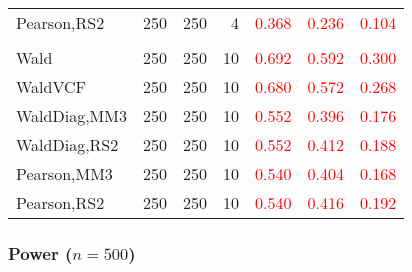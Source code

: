\documentclass[
]{article}
\begin{document}
\begin{table}[H]
{\begin{tabular}[t]{lrrrrrr}
\hspace{1em}Pearson,RS2 & 250 & 250 & 4 & \textcolor{red}{0.368} & \textcolor{red}{0.236} & \textcolor{red}{0.104}\\
\addlinespace[0.3em]
\multicolumn{7}{l}{\textbf{3F 15V}}\\
\hspace{1em}Wald & 250 & 250 & 10 & \textcolor{red}{0.692} & \textcolor{red}{0.592} & \textcolor{red}{0.300}\\
\hspace{1em}WaldVCF & 250 & 250 & 10 & \textcolor{red}{0.680} & \textcolor{red}{0.572} & \textcolor{red}{0.268}\\
\hspace{1em}WaldDiag,MM3 & 250 & 250 & 10 & \textcolor{red}{0.552} & \textcolor{red}{0.396} & \textcolor{red}{0.176}\\
\hspace{1em}WaldDiag,RS2 & 250 & 250 & 10 & \textcolor{red}{0.552} & \textcolor{red}{0.412} & \textcolor{red}{0.188}\\
\hspace{1em}Pearson,MM3 & 250 & 250 & 10 & \textcolor{red}{0.540} & \textcolor{red}{0.404} & \textcolor{red}{0.168}\\
\hspace{1em}Pearson,RS2 & 250 & 250 & 10 & \textcolor{red}{0.540} & \textcolor{red}{0.416} & \textcolor{red}{0.192}\\
\bottomrule
\end{tabular}}
\endgroup{}
\end{table}

\hypertarget{power-n500-1}{%
\subsubsection{\texorpdfstring{Power
(\(n=500\))}{Power (n=500)}}\label{power-n500-1}}
\end{document}
